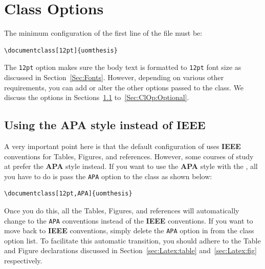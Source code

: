 \documentclass[12pt]{uomthesis}
\begin{document}
\section{Class Options}
\label{Sec:ClOp}
The minimum configuration of the first line of the file must be:

\begin{indentedQuote}
\begin{verbatim}
\documentclass[12pt]{uomthesis}
\end{verbatim}
\end{indentedQuote}

The \texttt{12pt} option makes sure the body text is formatted to \texttt{12pt} font size as discussed in Section~\ref{Sec:Fonts}. However, depending on various other requirements, you can add or alter the other options passed to the class. We discuss the options in Sections~\ref{Sec:ClOp:APA} to~\ref{Sec:ClOp:Optional}.

\subsection{Using the APA style instead of IEEE}
\label{Sec:ClOp:APA}

A very important point here is that the default configuration of \TheClass{} uses \textbf{IEEE} conventions for Tables, Figures, and references. However, some courses of study at \UoM{} prefer the \textbf{APA} style instead. If you want to use the \textbf{APA} style with the \TheClass, all you have to do is pass the \texttt{APA} option to the class as shown below:

\begin{indentedQuote}
\begin{verbatim}
\documentclass[12pt,APA]{uomthesis}
\end{verbatim}
\end{indentedQuote}

Once you do this, all the Tables, Figures, and references will automatically change to the \texttt{APA} conventions instead of the \textbf{IEEE} conventions. If you want to move back to \textbf{IEEE} conventions, simply delete the \texttt{APA} option in from the class option list. To facilitate this automatic transition, you should adhere to the Table and Figure declarations discussed in Section~\ref{sec:Latex:table} and~\ref{sec:Latex:fig} respectively.

\vspace{0.5cm}\noindent{}
\newline
\end{document}
